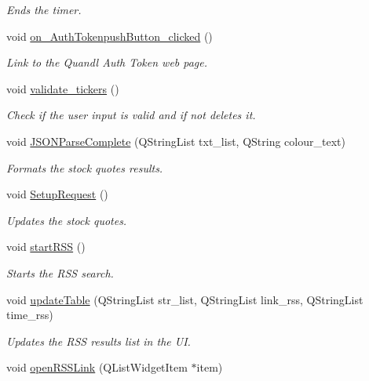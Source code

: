 \begin{DoxyCompactItemize}
\begin{DoxyCompactList}\small\item\em Ends the timer. \end{DoxyCompactList}\item 
void \hyperlink{class_t_k_r_t_a_p_a9742278d8b60423159e21585bbe1c68b}{on\+\_\+\+Auth\+Tokenpush\+Button\+\_\+clicked} ()
\begin{DoxyCompactList}\small\item\em Link to the Quandl Auth Token web page. \end{DoxyCompactList}\item 
void \hyperlink{class_t_k_r_t_a_p_ad012d6c7aad3cfcc06f5df8a392d308b}{validate\+\_\+tickers} ()
\begin{DoxyCompactList}\small\item\em Check if the user input is valid and if not deletes it. \end{DoxyCompactList}\item 
void \hyperlink{class_t_k_r_t_a_p_a0dc4e02bce5f50d8616a7118a021be34}{J\+S\+O\+N\+Parse\+Complete} (Q\+String\+List txt\+\_\+list, Q\+String colour\+\_\+text)
\begin{DoxyCompactList}\small\item\em Formats the stock quotes results. \end{DoxyCompactList}\item 
void \hyperlink{class_t_k_r_t_a_p_a9105ea4fbf86ffb8e373275677ea99ee}{Setup\+Request} ()
\begin{DoxyCompactList}\small\item\em Updates the stock quotes. \end{DoxyCompactList}\item 
void \hyperlink{class_t_k_r_t_a_p_a2e63c2e8c0b9f5662b06e8686eac0e64}{start\+R\+S\+S} ()
\begin{DoxyCompactList}\small\item\em Starts the R\+S\+S search. \end{DoxyCompactList}\item 
void \hyperlink{class_t_k_r_t_a_p_adec88a87264a22575064eb9c03eecfc7}{update\+Table} (Q\+String\+List str\+\_\+list, Q\+String\+List link\+\_\+rss, Q\+String\+List time\+\_\+rss)
\begin{DoxyCompactList}\small\item\em Updates the R\+S\+S results list in the U\+I. \end{DoxyCompactList}\item 
void \hyperlink{class_t_k_r_t_a_p_a0dd268ebec54f111eef86da401f459a1}{open\+R\+S\+S\+Link} (Q\+List\+Widget\+Item $\ast$item)

\end{DoxyCompactItemize}
